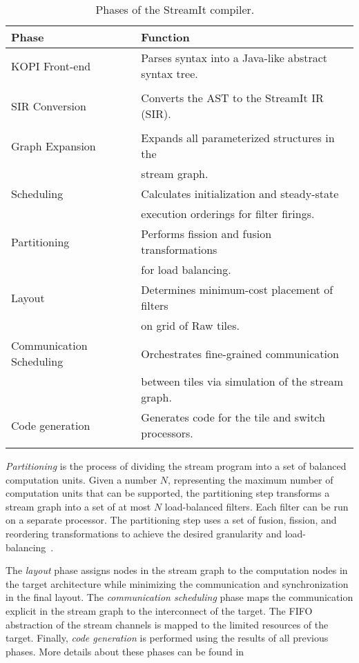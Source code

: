 \begin{table}[t]
\begin{center}
\scriptsize
\begin{tabular}{|l|l|} \hline
{\bf Phase} & {\bf Function} \\
\hline \hline
KOPI Front-end & Parses syntax into a Java-like abstract syntax tree. \\ &\\
\hline
SIR Conversion & Converts the AST to the StreamIt IR (SIR). \\ &\\
\hline
Graph Expansion & Expands all parameterized structures in the \\
                & stream graph. \\
\hline
Scheduling & Calculates initialization and steady-state \\
           & execution orderings for filter firings. \\
\hline
Partitioning & Performs fission and fusion transformations \\
             & for load balancing. \\
\hline
Layout & Determines minimum-cost placement of filters \\
       & on grid of Raw tiles. \\
\hline
Communication Scheduling & Orchestrates fine-grained communication \\
                         & between tiles via simulation of the stream graph. \\
\hline
Code generation & Generates code for the tile and switch processors. \\
&\\
\hline
\end{tabular}
\caption{\protect\small Phases of the StreamIt compiler. ~\cite{streamit-asplos}
\label{tab:phases}}
\end{center}
\end{table}

{\it Partitioning} is the process of dividing the stream program into
a set of balanced computation units.  Given a number $N$, representing
the maximum number of computation units that can be supported, the 
partitioning step transforms a stream graph into a set of at most $N$
load-balanced filters.  Each filter can be run on a separate processor.
The partitioning step uses a set of fusion, fission, and reordering 
transformations to achieve the desired granularity and load-balancing~\cite{streamit-asplos}.

The {\it layout} phase assigns nodes in the stream graph to the
computation nodes in the target architecture while minimizing the
communication and synchronization in the final layout.  The {\it
communication scheduling} phase maps the communication explicit
in the stream graph to the interconnect of the target.  The FIFO
abstraction of the stream channels is mapped to the limited resources
of the target.  Finally, {\it code generation} is performed using the
results of all previous phases.  More details about these phases can be 
found in~\cite{streamit-asplos}